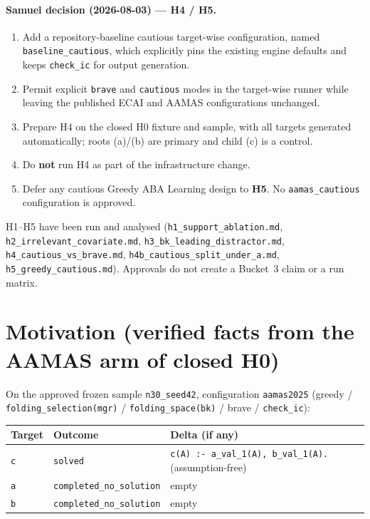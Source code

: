 \documentclass[11pt]{article}
\begin{document}
\paragraph{Samuel decision (2026-08-03) --- H4 / H5.}
\begin{enumerate}
  \item Add a repository-baseline cautious target-wise configuration, named
    \texttt{baseline\_cautious}, which explicitly pins the existing engine
    defaults and keeps \texttt{check\_ic} for output generation.
  \item Permit explicit \texttt{brave} and \texttt{cautious} modes in the
    target-wise runner while leaving the published ECAI and AAMAS
    configurations unchanged.
  \item Prepare H4 on the closed H0 fixture and sample, with all targets
    generated automatically; roots (a)/(b) are primary and child (c) is
    a control.
  \item Do \textbf{not} run H4 as part of the infrastructure change.
  \item Defer any cautious Greedy ABA Learning design to \textbf{H5}. No
    \texttt{aamas\_cautious} configuration is approved.
\end{enumerate}

H1--H5 have been run and analysed (\texttt{h1\_support\_ablation.md},
\texttt{h2\_irrelevant\_covariate.md}, \texttt{h3\_bk\_leading\_distractor.md},
\texttt{h4\_cautious\_vs\_brave.md}, \texttt{h4b\_cautious\_split\_under\_a.md},
\texttt{h5\_greedy\_cautious.md}).
Approvals do not create a Bucket~3 claim or a run matrix.

\section{Motivation (verified facts from the AAMAS arm of closed H0)}

{\raggedright
On the approved frozen sample \texttt{n30\_seed42}, configuration
\texttt{aamas2025} (greedy / \texttt{folding\_selection(mgr)} /
\texttt{folding\_space(bk)} / brave / \texttt{check\_ic}):
\par}

\begin{center}
\begin{tabular}{@{}lll@{}}
\toprule
Target & Outcome & Delta (if any) \\
\midrule
\texttt{c} & \texttt{solved} &
  \texttt{c(A) :- a\_val\_1(A), b\_val\_1(A).} (assumption-free) \\
\texttt{a} & \texttt{completed\_no\_solution} & empty \\
\texttt{b} & \texttt{completed\_no\_solution} & empty \\
\bottomrule
\end{tabular}
\end{center}
\end{document}
